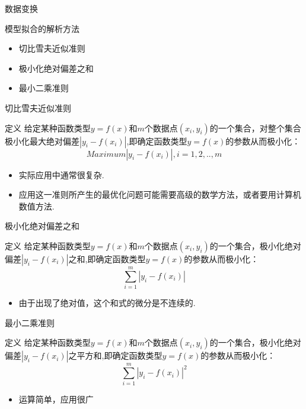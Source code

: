 \documentclass[UTF8]{ctexbeamer}
\begin{document}
\begin{frame}{数据变换}
\end{frame}

\begin{frame}{模型拟合的解析方法}
  \begin{itemize}
  \item 切比雪夫近似准则
  \item 极小化绝对偏差之和
  \item 最小二乘准则
  \end{itemize}
\end{frame}

\begin{frame}{切比雪夫近似准则}
  \begin{block}{定义}
    给定某种函数类型$y=f(x)$和$m$个数据点$(x_i, y_i)$的一个集合，对整个集合极小化最大绝对偏差$|y_i - f(x_i)|$,即确定函数类型$y=f(x)$的参数从而极小化：
    \[
    Maximum |y_i - f(x_i)|,  i = 1, 2, .., m
    \]
  \end{block}

  \begin{itemize}
  \item 实际应用中通常很复杂.
  \item 应用这一准则所产生的最优化问题可能需要高级的数学方法，或者要用计算机数值方法.
  \end{itemize}

\end{frame}

\begin{frame}{极小化绝对偏差之和}
    \begin{block}{定义}
    给定某种函数类型$y=f(x)$和$m$个数据点$(x_i, y_i)$的一个集合，极小化绝对偏差$|y_i - f(x_i)|$之和,即确定函数类型$y=f(x)$的参数从而极小化：
    \[
    \sum_{i=1}^m |y_i - f(x_i)|
    \]
  \end{block}

  \begin{itemize}
  \item 由于出现了绝对值，这个和式的微分是不连续的.
  \end{itemize}

\end{frame}

\begin{frame}{最小二乘准则}
    \begin{block}{定义}
    给定某种函数类型$y=f(x)$和$m$个数据点$(x_i, y_i)$的一个集合，极小化绝对偏差$|y_i - f(x_i)|$之平方和,即确定函数类型$y=f(x)$的参数从而极小化：
    \[
    \sum_{i=1}^m |y_i - f(x_i)|^2
    \]
  \end{block}

  \begin{itemize}
  \item 运算简单，应用很广
  \end{itemize}
  
\end{frame}
\end{document}
